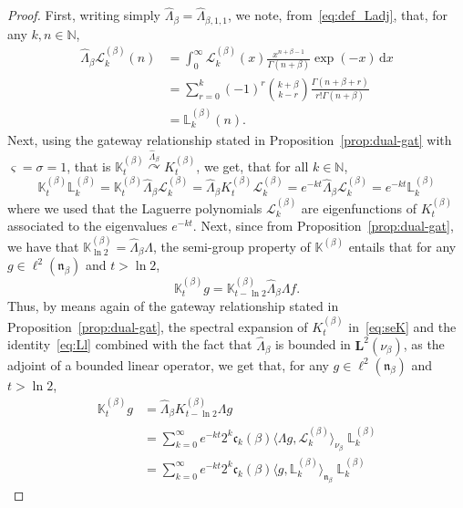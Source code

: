 \documentclass[10pt]{amsart}
\theoremstyle{definition}\newtheorem{defi}[theo]{Definition}\newtheorem{rema}[theo]{Remark}\newtheorem{exam}[theo]{Example}\newtheorem{exem}[theo]{Example}\newtheorem{nota}[theo]{Notation}
\newcommand{\NN}{\mathbb{N}}
\newcommand{\fn}{\mathfrak{n}}
\newcommand{\wit}{\widehat}
\newcommand{\dLs}{{\discret{K}}}
\newcommand{\Ls}{K}
\newcommand{\esL}{\mathbf{L}}
\newcommand{\esLd}{\ell}
\newcommand{\discret}[1]{\mathds{#1}}
\newcommand{\Ks}{\discret{K}}
\newcommand{\eigL}{\mathbb{L}_k}
\newcommand{\Gate}[3]{#1\stackrel{#2}{\curvearrowright}#3}
\newcommand*{\dd}{\mathrm{d}}
\newcommand*{\dx}{\dd x}
\begin{document}
\begin{proof}
First, writing simply $\wit \Lambda_{\beta}=\wit \Lambda_{\beta,1,1}$, we note, from~\eqref{eq:def_Ladj}, that, for any $k,n\in \NN$,
\begin{align}\label{eq:Ll}
\nonumber \wit \Lambda_{\beta}\mathcal{L}^{(\beta)}_k(n)&= \int_0^{\infty}\mathcal{L}^{(\beta)}_k(x)\frac{x^{n+\beta-1}}{\Gamma(n+\beta)}\exp(- x)\, \dx\\
&= \sum_{r=0}^k (-1)^r \binom{ k +\beta}{k-r} \frac{\Gamma(n+\beta+r)}{r! \Gamma(n+\beta)}\nonumber \\
&= \eigL^{(\beta)}(n).\phantom{\int^1}
\end{align}
Next, using the gateway relationship stated in Proposition~\ref{prop:dual-gat} with $\varsigma=\sigma=1$, that is $\Gate{\dLs_{t}^{(\beta)}}{\wit \Lambda_{\beta}}{\Ls_{t}^{(\beta)}}$, we get, that for all $k \in \mathbb{N}$,
\begin{equation*}\label{}
\Ks^{(\beta)}_t \eigL^{(\beta)} = \Ks^{(\beta)}_t \wit \Lambda_{\beta} \mathcal{L}^{(\beta)}_k= \wit \Lambda_{\beta} \Ls^{(\beta)}_t\mathcal{L}^{(\beta)}_k = e^{- k t } \wit \Lambda_{\beta} \mathcal{L}^{(\beta)}_k= e^{- k t } \eigL^{(\beta)}
\end{equation*}
where we used that the Laguerre polynomials $ \mathcal{L}^{(\beta)}_k$ are eigenfunctions of $\Ls^{(\beta)}_t$ associated to the eigenvalues $e^{-kt}$. Next, since from Proposition~\ref{prop:dual-gat}, we have that $\Ks^{(\beta)}_{\ln 2}=\wit \Lambda_{\beta} \Lambda$, the semi-group property of $\Ks^{(\beta)}$ entails that for any $ g \in \esLd^2(\fn_{\beta}) $ and $t>\ln 2$,
\[
\Ks^{(\beta)}_t g = \Ks^{(\beta)}_{t-\ln 2}\wit \Lambda_{\beta} \Lambda f.
\]
Thus, by means again of the gateway relationship stated in Proposition~\ref{prop:dual-gat}, the spectral expansion of $\Ls^{(\beta)}_t $ in~\eqref{eq:seK} and the identity~\eqref{eq:Ll} combined with the fact that $\wit \Lambda_{\beta}$ is bounded in $\esL^2(\nu_{\beta})$, as the adjoint of a bounded linear operator, we get that, for any $ g \in \esLd^2(\fn_{\beta}) $ and $t>\ln 2$,
\begin{align*}
\Ks^{(\beta)}_t g &= \wit \Lambda_{\beta} \Ls^{(\beta)}_{t-\ln 2} \Lambda g\phantom{\int_0} \\
&= \sum_{k=0}^{\infty}e^{-k t} 2^{k}\mathfrak{c}_{k}(\beta) \langle \Lambda g, \mathcal{L}^{(\beta)}_k \rangle_{\nu_{\beta}}\; \eigL^{(\beta)}\\
&= \sum_{k=0}^{\infty}e^{-k t} 2^{k}\mathfrak{c}_{k}(\beta) \langle g, \eigL^{(\beta)} \rangle_{\fn_{\beta}}\; \eigL^{(\beta)}

\end{align*}
\end{proof}
\end{document}
